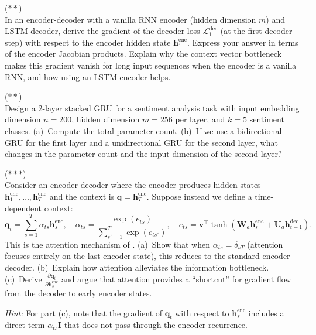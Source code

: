 \documentclass[11pt,a4paper]{article}
\begin{document}
\begin{exercise}
\textnormal{(\(\ast\ast\))} \\
In an encoder-decoder with a vanilla RNN encoder (hidden dimension
$m$) and LSTM decoder, derive the gradient of the decoder loss
$\mathcal{L}_1^{\text{dec}}$ (at the first decoder step) with
respect to the encoder hidden state $\mathbf{h}_1^{\text{enc}}$.
Express your answer in terms of the encoder Jacobian products.
Explain why the context vector bottleneck makes this gradient
vanish for long input sequences when the encoder is a vanilla RNN,
and how using an LSTM encoder helps.
\end{exercise}

\begin{exercise}
\textnormal{(\(\ast\ast\))} \\
Design a 2-layer stacked GRU for a sentiment analysis task with
input embedding dimension $n = 200$, hidden dimension $m = 256$ per
layer, and $k = 5$ sentiment classes.  (a)~Compute the total
parameter count.  (b)~If we use a bidirectional GRU for the first
layer and a unidirectional GRU for the second layer, what changes
in the parameter count and the input dimension of the second layer?
\end{exercise}

\begin{exercise}
\textnormal{(\(\ast\ast\ast\))} \\
Consider an encoder-decoder where the encoder produces hidden states
$\mathbf{h}_1^{\text{enc}}, \ldots, \mathbf{h}_T^{\text{enc}}$ and
the context is $\mathbf{q} = \mathbf{h}_T^{\text{enc}}$.  Suppose
instead we define a time-dependent context:
\[
  \mathbf{q}_t = \sum_{s=1}^{T} \alpha_{ts}
    \mathbf{h}_s^{\text{enc}}, \quad
  \alpha_{ts} = \frac{\exp(e_{ts})}{\sum_{s'=1}^T \exp(e_{ts'})},
  \quad
  e_{ts} = \mathbf{v}^\top \tanh(\mathbf{W}_a
    \mathbf{h}_s^{\text{enc}} + \mathbf{U}_a
    \mathbf{h}_{t-1}^{\text{dec}}).
\]
This is the attention mechanism of \citet{bahdanau2015}.
(a)~Show that when $\alpha_{ts} = \delta_{sT}$ (attention focuses
entirely on the last encoder state), this reduces to the standard
encoder-decoder.
(b)~Explain how attention alleviates the information bottleneck.
(c)~Derive $\frac{\partial \mathbf{q}_t}{\partial
\mathbf{h}_s^{\text{enc}}}$ and argue that attention provides a
``shortcut'' for gradient flow from the decoder to early encoder
states.

\textit{Hint:} For part (c), note that the gradient of
$\mathbf{q}_t$ with respect to $\mathbf{h}_s^{\text{enc}}$ includes
a direct term $\alpha_{ts} \mathbf{I}$ that does not pass through
the encoder recurrence.
\end{exercise}
\end{document}
